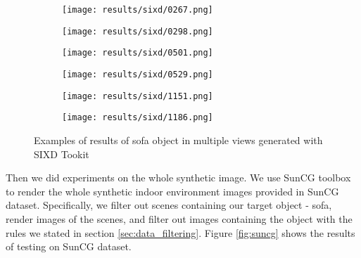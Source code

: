\begin{figure}[h!]
  \centering
  \begin{subfigure}[b]{0.32\linewidth}
    \texttt{[image: results/sixd/0267.png]}
  \end{subfigure}
  \begin{subfigure}[b]{0.32\linewidth}
    \texttt{[image: results/sixd/0298.png]}
  \end{subfigure}
  \begin{subfigure}[b]{0.32\linewidth}
    \texttt{[image: results/sixd/0501.png]}
  \end{subfigure}
  \begin{subfigure}[b]{0.32\linewidth}
    \texttt{[image: results/sixd/0529.png]}
  \end{subfigure}
  \begin{subfigure}[b]{0.32\linewidth}
    \texttt{[image: results/sixd/1151.png]}
  \end{subfigure}
  \begin{subfigure}[b]{0.32\linewidth}
    \texttt{[image: results/sixd/1186.png]}
  \end{subfigure}
  \caption{Examples of results of sofa object in multiple views generated with SIXD Tookit}
  \label{fig:sixd}
\end{figure}

Then we did experiments on the whole synthetic image. We use SunCG toolbox to render the whole synthetic indoor environment images provided in SunCG dataset. Specifically, we filter out scenes containing our target object - sofa, render images of the scenes, and filter out images containing the object with the rules we stated in section \ref{sec:data_filtering}. Figure \ref{fig:suncg} shows the results of testing on SunCG dataset.

